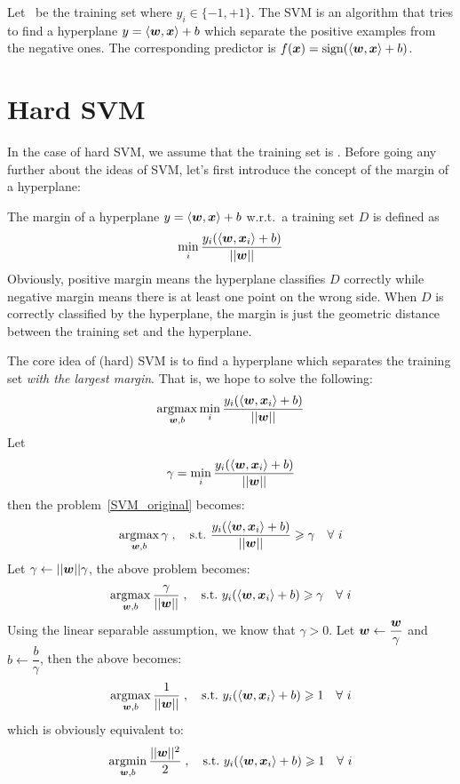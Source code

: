 Let \dataset\ be the training set where $y_i \in\{-1, +1\}$. The SVM is an algorithm that tries to find a 
hyperplane $y = \langle\boldsymbol{w}, \boldsymbol{x}\rangle + b$ which separate the positive examples from the negative ones. The 
corresponding predictor is $f(\boldsymbol{x}) = \operatorname{sign}(\langle\boldsymbol{w}, \boldsymbol{x}\rangle + b)$.

\section{Hard SVM}
In the case of hard SVM, we assume that the training set is . Before going any 
further about the ideas of SVM, let's first introduce the concept of the margin of a hyperplane:
\begin{df}[Margin]
    The margin of a hyperplane $y = \langle\boldsymbol{w}, \boldsymbol{x}\rangle + b$ w.r.t.\ a training set  $D$ is defined as
    \begin{equation*}
    \min_i \frac{y_i(\langle\boldsymbol{w}, \boldsymbol{x}_i\rangle + b)}{||\boldsymbol{w}||}
    \end{equation*}
    Obviously, positive margin means the hyperplane classifies $D$ correctly while negative margin means
    there is at least one point on the wrong side.
    When $D$ is correctly classified by the hyperplane, the margin is just the geometric distance between the
    training set and the hyperplane.
\end{df}

The core idea of (hard) SVM is to find a hyperplane which separates the training set
\textit{with the largest margin}. That is, we hope to solve the following:
\begin{equation}\label{SVM_original}
    \operatorname*{argmax}_{\boldsymbol{w}, b}\min_i \frac{y_i(\langle\boldsymbol{w}, \boldsymbol{x}_i\rangle + b)}{||\boldsymbol{w}||}
\end{equation}
Let
$$\gamma =\min_i \frac{y_i(\langle\boldsymbol{w}, \boldsymbol{x}_i\rangle + b)}{||\boldsymbol{w}||}$$
then the problem~\eqref{SVM_original} becomes:
\begin{equation}
    \operatorname*{argmax}_{\boldsymbol{w}, b} \gamma\;,\quad \text{s.t.\ } \frac{y_i(\langle\boldsymbol{w}, \boldsymbol{x}_i\rangle + b)}{||\boldsymbol{w}||} \geqslant
     \gamma \quad\forall\ i
\end{equation}
Let $\gamma \gets ||\boldsymbol{w}||\gamma$, the above problem becomes:
\begin{equation}
    \operatorname*{argmax}_{\boldsymbol{w}, b} \frac{\gamma}{||\boldsymbol{w}||}\;,\quad \text{s.t.\ } y_i(\langle\boldsymbol{w}, \boldsymbol{x}_i\rangle + b) \geqslant
    \gamma \quad\forall\ i
\end{equation}
Using the linear separable assumption, we know that $\gamma > 0$. Let $\boldsymbol{w} \gets \dfrac{\boldsymbol{w}}{\gamma}$
and $b \gets \dfrac{b}{\gamma}$, then the above becomes:
\begin{equation}\label{SVM_argmax}
    \operatorname*{argmax}_{\boldsymbol{w}, b} \frac{1}{||\boldsymbol{w}||}\;,\quad \text{s.t.\ } y_i(\langle\boldsymbol{w}, \boldsymbol{x}_i\rangle + b) \geqslant 1
    \quad\forall\ i
\end{equation}
which is obviously equivalent to:
\begin{equation}\label{hard_SVM}
    \operatorname*{argmin}_{\boldsymbol{w}, b} \frac{||\boldsymbol{w}||^2}{2}\;,\quad \text{s.t.\ } y_i(\langle\boldsymbol{w}, \boldsymbol{x}_i\rangle + b) \geqslant 1
    \quad\forall\ i
\end{equation}

